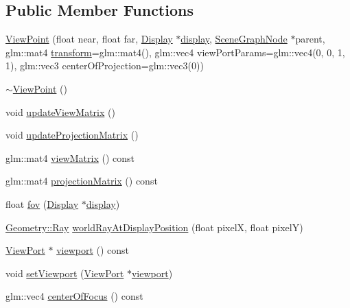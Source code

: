 \subsection*{Public Member Functions}
\begin{DoxyCompactItemize}
\item 
\hyperlink{classmotorcar_1_1ViewPoint_af5805de3e5ed03bd7d2dee2e9a2d147f}{View\-Point} (float near, float far, \hyperlink{classmotorcar_1_1Display}{Display} $\ast$\hyperlink{structdisplay}{display}, \hyperlink{classmotorcar_1_1SceneGraphNode}{Scene\-Graph\-Node} $\ast$parent, glm\-::mat4 \hyperlink{classmotorcar_1_1SceneGraphNode_ad96e79fdd739ac8223a3128003be391a}{transform}=glm\-::mat4(), glm\-::vec4 view\-Port\-Params=glm\-::vec4(0, 0, 1, 1), glm\-::vec3 center\-Of\-Projection=glm\-::vec3(0))
\item 
\hyperlink{classmotorcar_1_1ViewPoint_add72302715c1fbb5c75a0a1c37fa0480}{$\sim$\-View\-Point} ()
\item 
void \hyperlink{classmotorcar_1_1ViewPoint_a3b3ab463cfc36488401940316b0cb929}{update\-View\-Matrix} ()
\item 
void \hyperlink{classmotorcar_1_1ViewPoint_a9c6a1e5584cfdb7f2ec85b7f0f46f9f9}{update\-Projection\-Matrix} ()
\item 
glm\-::mat4 \hyperlink{classmotorcar_1_1ViewPoint_af5a13ecd8d8e433a45bd28f997e64a7b}{view\-Matrix} () const 
\item 
glm\-::mat4 \hyperlink{classmotorcar_1_1ViewPoint_a7d074cab26646cc98bfb4f04d050439d}{projection\-Matrix} () const 
\item 
float \hyperlink{classmotorcar_1_1ViewPoint_a9838e5d3735bc9c97c32ce4a3299d904}{fov} (\hyperlink{classmotorcar_1_1Display}{Display} $\ast$\hyperlink{structdisplay}{display})
\item 
\hyperlink{structmotorcar_1_1Geometry_1_1Ray}{Geometry\-::\-Ray} \hyperlink{classmotorcar_1_1ViewPoint_a51a8062c2f29ac0e9a49369cdba7789d}{world\-Ray\-At\-Display\-Position} (float pixel\-X, float pixel\-Y)
\item 
\hyperlink{classmotorcar_1_1ViewPort}{View\-Port} $\ast$ \hyperlink{classmotorcar_1_1ViewPoint_afc15eb323f3dd5b6d1eb8cb266eb2041}{viewport} () const 
\item 
void \hyperlink{classmotorcar_1_1ViewPoint_a5c29d256506c86422c58f8fd8aa2ae3e}{set\-Viewport} (\hyperlink{classmotorcar_1_1ViewPort}{View\-Port} $\ast$\hyperlink{structviewport}{viewport})
\item 
glm\-::vec4 \hyperlink{classmotorcar_1_1ViewPoint_a23a9f5eea733551393489b962be957ef}{center\-Of\-Focus} () const 

\end{DoxyCompactItemize}
